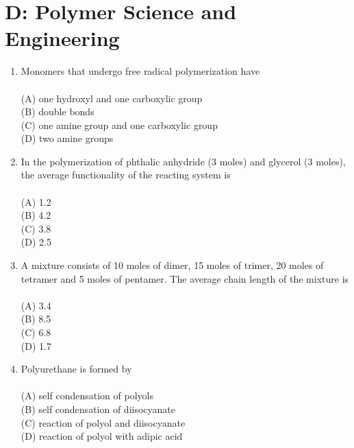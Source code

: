 \documentclass[journal,12pt,onecolumn]{IEEEtran}
\begin{document}
\section*{D: Polymer Science and Engineering}
\vspace{1cm}
\begin{enumerate}[label=\arabic*)]

\item Monomers that undergo free radical polymerization have\\
\vspace{0.2cm}
\hfill{} \\
(A) one hydroxyl and one carboxylic group\\
(B) double bonds\\
(C) one amine group and one carboxylic group\\
(D) two amine groups
\vspace{0.5cm}

\item In the polymerization of phthalic anhydride (3 moles) and glycerol (3 moles), the average functionality of the reacting system is\\
\vspace{0.2cm}
\hfill{} \\
(A) 1.2\\
(B) 4.2\\
(C) 3.8\\
(D) 2.5
\vspace{0.5cm}

\item A mixture consists of 10 moles of dimer, 15 moles of trimer, 20 moles of tetramer and 5 moles of pentamer. The average chain length of the mixture is\\
\vspace{0.2cm}
\hfill{} \\
(A) 3.4\\
(B) 8.5\\
(C) 6.8\\
(D) 1.7
\vspace{0.5cm}

\item Polyurethane is formed by\\
\vspace{0.2cm}
\hfill{} \\
(A) self condensation of polyols\\
(B) self condensation of diisocyanate\\
(C) reaction of polyol and diisocyanate\\
(D) reaction of polyol with adipic acid
\vspace{0.5cm}


\end{enumerate}
\end{document}
